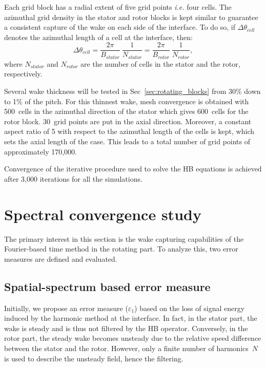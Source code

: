 Each grid block has a radial extent of five grid points \emph{i.e.} four cells. 
The azimuthal grid density in the stator and rotor blocks is kept similar
to guarantee a consistent capture of the wake on each side of the interface.
To do so, if $\Delta \theta_{cell}$ denotes the azimuthal length of a cell
at the interface, then:
\begin{equation}
   \Delta \theta_{cell} = \frac{2\pi}{B_{stator}}~\frac{1}{N_{stator}}
   = \frac{2\pi}{B_{rotor}}~\frac{1}{N_{rotor}},
   \label{eq:az_spatial_discretization_1}
\end{equation}
where $N_{stator}$ and $N_{rotor}$ are the number of cells
in the stator and the rotor, respectively. 

Several wake thickness will be tested in Sec~\ref{sec:rotating_blocks}
from 30\% down to 1\% of the pitch. For this thinnest wake, 
mesh convergence
is obtained with 500~cells in the azimuthal direction of
the stator which gives
600~cells for the rotor block.
30~grid points are put in the axial direction. Moreover, a constant
aspect ratio of 5 with respect to the azimuthal length of the cells is
kept, which sets the axial length of the case.
This leads to a total number of grid points of approximately 
170,000. 

Convergence of the iterative procedure used to solve the HB equations is achieved 
after 3,000 iterations for 
all the simulations. 

\section{Spectral convergence study}
The primary interest in this section is the wake capturing capabilities of the 
Fourier-based time method in the rotating part. 
To analyze this, two error measures are defined and
evaluated. 

\subsection{Spatial-spectrum based error measure}
\label{sec:crit_1}
Initially, we propose an error measure ($\varepsilon_1$) based 
on the loss of signal energy
induced by the harmonic method at the interface. 
In fact, in the stator part, the wake is steady and is thus not
filtered by the HB operator. 
Conversely, in the rotor part, the steady wake becomes
unsteady due to the relative speed difference between the
stator and the rotor. However, only a finite number of harmonics~$N$
is used to describe the unsteady field, hence the filtering.

